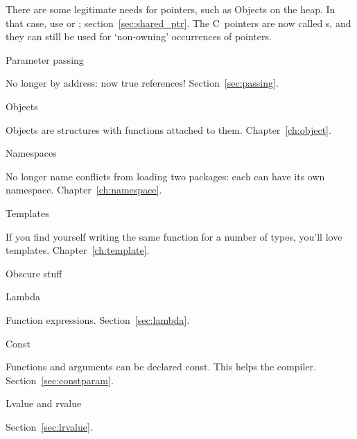 There are some legitimate needs for pointers, such as Objects on the
heap. In that case, use  or ;
section~\ref{sec:shared_ptr}.
The C~pointers are now called s, and they
can still be used for `non-owning' occurrences of pointers.

 {Parameter passing}

No longer by address: now true references! Section~\ref{sec:passing}.

 {Objects}

Objects are structures with functions attached to
them. Chapter~\ref{ch:object}.

 {Namespaces}

No longer name conflicts from loading two packages: each can have its
own namespace. Chapter~\ref{ch:namespace}.

 {Templates}

If you find yourself writing the same function for a number of types,
you'll love templates. Chapter~\ref{ch:template}.

 {Obscure stuff}

 {Lambda}

Function expressions.
Section~\ref{sec:lambda}.

 {Const}

Functions and arguments can be declared const. This helps the
compiler. Section~\ref{sec:constparam}.

 {Lvalue and rvalue}

Section~\ref{sec:lrvalue}.

\endinput

You’ll have no destructors, so cleanup is manual. This is most fun
with early-return functions, but it can keep you entertained for all
cases. File handles, memory, and other resources (thread locks,
anyone) are all waiting patiently and silently for you to forget them.

Initialization has be be explicitly called. No constructors either.

Want inheritance? Sure. Write your own vtable (often done with function pointers in a struct).
Instead of templates, you’ll need to abandon type safety and cast back and forth to (void*). Don’t explicitly cast to (void *), because the compiler never warns about explicit or implicit casts to and from (void *).

You’ll also need to make sure you’re using the right library calls - snprintf versus sprintf etc. Hopefully an existing project will be using the right ones.

